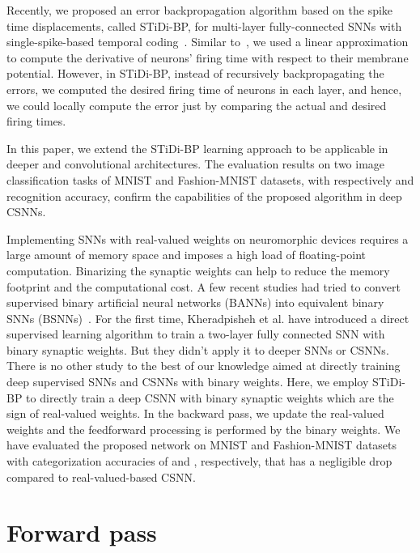 \documentclass[preprint,twocolumn,5p,12pt]{article}
\begin{document}
Recently, we proposed an error backpropagation algorithm based on the spike time displacements, called STiDi-BP, for multi-layer fully-connected SNNs with single-spike-based temporal coding~\cite{R3}. Similar to~\cite{R18, R7, R10}, we used a linear approximation to compute the derivative of neurons' firing time with respect to their membrane potential. However, in STiDi-BP, instead of recursively backpropagating the errors, we computed the desired firing time of neurons in each layer, and hence, we could locally compute the error just by comparing the actual and desired firing times. 

In this paper, we extend the STiDi-BP learning approach to be applicable in deeper and convolutional architectures. The evaluation results on two image classification tasks of MNIST and Fashion-MNIST datasets, with respectively  and  recognition accuracy, confirm the capabilities of the proposed algorithm in deep CSNNs.

Implementing SNNs with real-valued weights on neuromorphic devices requires a large amount of memory space and imposes a high load of floating-point computation. Binarizing the synaptic weights can help to reduce the memory footprint and the computational cost.
A few recent studies had tried to convert supervised binary artificial neural networks (BANNs) into equivalent binary SNNs (BSNNs)~\cite{R14,R15,R16,R19}. For the first time, Kheradpisheh et al. have introduced a direct supervised learning algorithm to train a two-layer fully connected SNN with binary synaptic weights\cite{R17}. But they didn't apply it to deeper SNNs or CSNNs. There is no other study to the best of our knowledge aimed at directly training deep supervised SNNs and CSNNs with binary weights. 
Here, we employ STiDi-BP to directly train a deep CSNN with binary synaptic weights which are the sign of real-valued weights. In the backward pass, we update the real-valued weights and the feedforward processing is performed by the binary weights.
We have evaluated the proposed network on MNIST and Fashion-MNIST datasets with categorization accuracies of  and , respectively, that has a negligible drop compared to real-valued-based CSNN.


\section{Forward pass}
\end{document}
